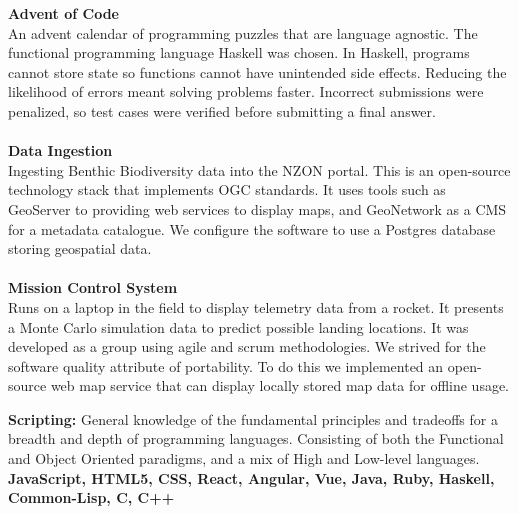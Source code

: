 \documentclass[9pt]{developercv}
\begin{document}


{
	\textbf{Advent of Code}
	\\
	An advent calendar of programming puzzles that are language agnostic. The functional programming language Haskell was chosen. In Haskell, programs cannot store state so functions cannot have unintended side effects. Reducing the likelihood of errors meant solving problems faster. Incorrect submissions were penalized, so test cases were verified before submitting a final answer.
	\\\\
}
{
	\textbf{Data Ingestion}
	\\
	Ingesting Benthic Biodiversity data into the NZON portal. This is an open-source technology stack that implements OGC standards. It uses tools such as GeoServer to providing web services to display maps, and GeoNetwork as a CMS for a metadata catalogue. We configure the software to use a Postgres database storing geospatial data.
	\\\\
}
{
	\textbf{Mission Control System}
	\\
	Runs on a laptop in the field to display telemetry data from a rocket. It presents a Monte Carlo simulation data to predict possible landing locations. It was developed as a group using agile and scrum methodologies. We strived for the software quality attribute of portability. To do this we implemented an open-source web map service that can display locally stored map data for offline usage.
}



\textbf{Scripting:} General knowledge of the fundamental principles and tradeoffs for a breadth and depth of programming languages. Consisting of both the Functional and Object Oriented paradigms, and a mix of High and Low-level languages. \textbf{JavaScript, HTML5, CSS, React, Angular, Vue, Java, Ruby, Haskell, Common-Lisp, C, C++} \\
\end{document}
